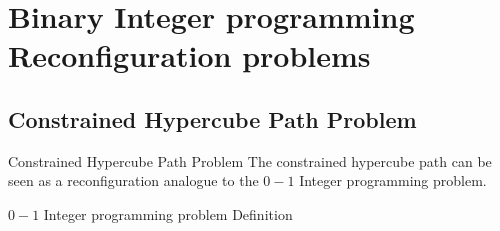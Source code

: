 \section{Binary Integer programming Reconfiguration problems}
\subsection{Constrained Hypercube Path Problem}

\begin{frame}{Constrained Hypercube Path Problem}
  The constrained hypercube path can be seen as a reconfiguration analogue to the $0 − 1$
  Integer programming problem.

  \begin{block}{$0 − 1$ Integer programming problem Definition}

  \end{block}

\end{frame}
